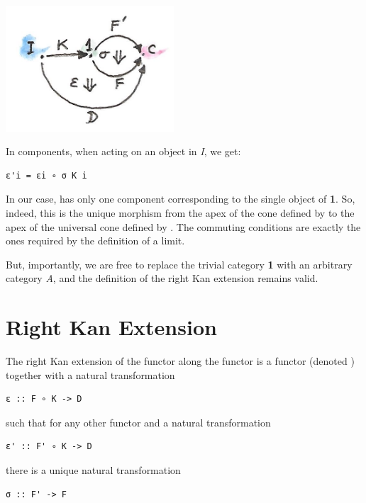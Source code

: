 \includegraphics[width=2.46875in]{images/kan5.jpg}

In components, when acting on an object  in \emph{I}, we get:

\begin{verbatim}
ε'i = εi ∘ σ K i
\end{verbatim}

In our case,  has only one component corresponding to the
single object of \textbf{1}. So, indeed, this is the unique morphism
from the apex of the cone defined by  to the apex of
the universal cone defined by . The commuting conditions
are exactly the ones required by the definition of a limit.

But, importantly, we are free to replace the trivial category \textbf{1}
with an arbitrary category \emph{A}, and the definition of the right Kan
extension remains valid.

\section{Right Kan Extension}\label{right-kan-extension}

The right Kan extension of the functor 
along the functor  is a functor
 (denoted ) together with a
natural transformation

\begin{verbatim}
ε :: F ∘ K -> D
\end{verbatim}

such that for any other functor  and
a natural transformation

\begin{verbatim}
ε' :: F' ∘ K -> D
\end{verbatim}

there is a unique natural transformation

\begin{verbatim}
σ :: F' -> F
\end{verbatim}

